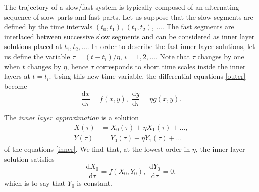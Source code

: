\documentclass{llncs}
\newcommand{\vect}[1]{\ensuremath{  #1 } }
\newcommand{\D}[2]{ \ensuremath{ \frac{\mathrm{d} #1 }{\mathrm{d} #2 } }}
\begin{document}
The trajectory of a slow/fast system is typically composed of an alternating
sequence of slow parts and fast parts. Let us suppose that the slow segments
are defined by the time intervals $(t_0,t_1)$, $(t_1,t_2)$, $\ldots$. The fast
segments are interlaced between successive slow segments and can be
considered as inner layer solutions placed at $t_1,t_2,\ldots$. In order to
describe the fast inner layer solutions, let us define the variable $\tau =
(t-t_i) / \eta$, $i=1,2,\ldots$. Note that $\tau$ changes by one when $t$
changes by $\eta$, hence $\tau$ corresponds to
short time scales inside the inner layers at $t=t_i$. Using this new time
variable, the differential equations \eqref{outer} become
\begin{equation}
\D{\vect{x}}{\tau}  = \vect{f}(\vect{x},\vect{y}),\,\,
\D{\vect{y}}{\tau}  = \eta  \vect{g}(\vect{x},\vect{y}). \label{inner}
\end{equation}

The \textit{inner layer approximation} is a solution
\begin{align*}X(\tau) &= X_0(\tau) + \eta X_1(\tau) + \ldots,\\
Y(\tau) &= Y_0(\tau) + \eta Y_1(\tau) + \ldots\end{align*}
of the equations \eqref{inner}. We find that, at the lowest order in
$\eta$, the inner layer solution satisfies
\begin{equation}
\D{\vect{X_0}}{\tau}  = \vect{f}(\vect{X}_0,\vect{Y}_0),\,\,
\D{\vect{Y_0}}{\tau}  = 0, \label{inner0}
\end{equation}
which is to say that $Y_0$ is constant.
\end{document}
